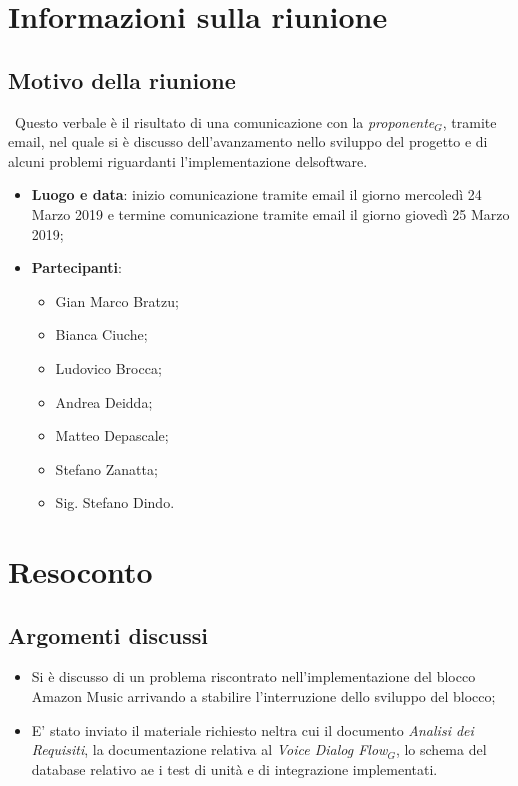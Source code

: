 \documentclass[a4paper,12pt]{article}
\begin{document}
	\tableofcontents
	\cleardoublepage
	\section{Informazioni sulla riunione}
\subsection{Motivo della riunione}\ Questo verbale è il risultato di una comunicazione con la \textit{proponente$_{G}$}, tramite email, nel quale si è discusso dell'avanzamento nello sviluppo del progetto e di alcuni problemi riguardanti l'implementazione delsoftware.

\begin{itemize}
	\item \textbf{Luogo e data}: inizio comunicazione tramite email il giorno mercoledì 24 Marzo 2019 e termine comunicazione tramite email il giorno giovedì 25 Marzo 2019;
	\item \textbf{Partecipanti}:  
	\begin{itemize}
		\item Gian Marco Bratzu;
		\item Bianca Ciuche;
		\item Ludovico Brocca;
		\item Andrea Deidda;
		\item Matteo Depascale;
		\item Stefano Zanatta;
		\item Sig. Stefano Dindo.
	\end{itemize}
\end{itemize}
	
	\section{Resoconto}
	\subsection{Argomenti discussi}
	\begin{itemize}		
		\item Si è discusso di un problema riscontrato nell'implementazione del blocco Amazon Music arrivando a stabilire l'interruzione dello sviluppo del blocco;
		\item E' stato inviato il materiale richiesto neltra cui il documento \emph{Analisi dei Requisiti}, la documentazione relativa al \textit{Voice Dialog Flow$_{G}$}, lo schema del database relativo ae i test di unità e di integrazione implementati.
	\end{itemize}
	
\end{document}
